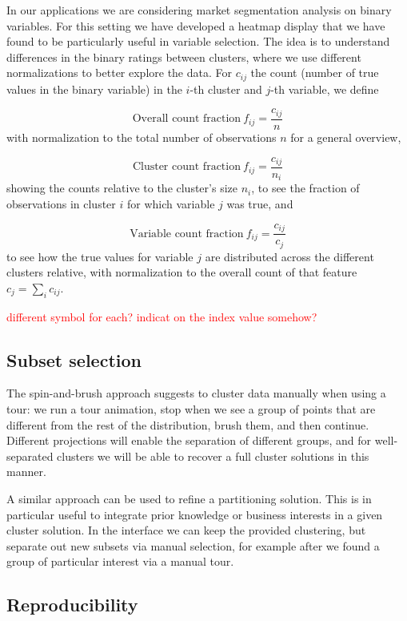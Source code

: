 \documentclass[article]{ajs}
\begin{document}
In our applications we are considering market segmentation analysis on binary variables. For this setting we have developed a heatmap display that we have found to be particularly useful in variable selection. The idea is to understand differences in the binary ratings between clusters, where we use different normalizations to better explore the data. For \(c_{ij}\) the count (number of true values in the binary variable) in the \(i\)-th cluster and \(j\)-th variable, we define


\[
\text{Overall count fraction}\ f_{ij} = \frac{c_{ij}}{n}
\]
with normalization to the total number of observations $n$ for a general overview,

\[
\text{Cluster count fraction}\  f_{ij} = \frac{c_{ij}}{n_{i}}
\]
showing the counts relative to the cluster's size \(n_i\), to see the fraction of observations in cluster $i$ for which variable $j$ was true, and


\[
\text{Variable count fraction}\ f_{ij} = \frac{c_{ij}}{c_{j}}
\]
to see how the true values for variable $j$ are distributed across the different clusters relative, with normalization to the overall count of that feature \(c_j = \sum_i c_{ij}\).
 
\textcolor{red}{different symbol for each? indicat on the index value somehow?}

\subsection{Subset selection}

The spin-and-brush approach suggests to cluster data manually when using a tour: we run a tour animation, stop when we see a group of points that are different from the rest of the distribution, brush them, and then continue. Different projections will enable the separation of different groups, and for well-separated clusters we will be able to recover a full cluster solutions in this manner.

A similar approach can be used to refine a partitioning solution. This is in particular useful to integrate prior knowledge or business interests in a given cluster solution. In the interface we can keep the provided clustering, but separate out new subsets via manual selection, for example after we found a group of particular interest via a manual tour.

\subsection{Reproducibility}
\end{document}
